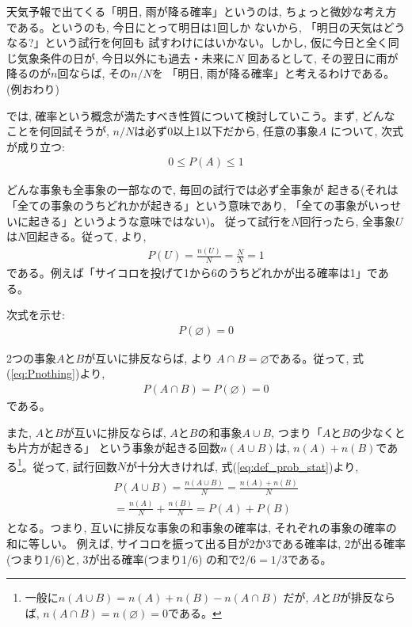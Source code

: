 \begin{exmpl} 天気予報で出てくる「明日, 雨が降る確率」というのは, 
ちょっと微妙な考え方である。というのも, 今日にとって明日は1回しか
ないから, 「明日の天気はどうなる?」という試行を何回も
試すわけにはいかない。しかし, 仮に今日と全く同じ気象条件の日が, 
今日以外にも過去・未来に$N$
回あるとして, その翌日に雨が降るのが$n$回ならば, その$n/N$を
「明日, 雨が降る確率」と考えるわけである。(例おわり)\end{exmpl}

\begin{freqmiss}{\small{}}\end{freqmiss}
\mv

では, 確率という概念が満たすべき性質について検討していこう。まず, 
どんなことを何回試そうが, $n/N$は必ず0以上1以下だから, 任意の事象$A$
について, 次式が成り立つ:
\begin{eqnarray}0\leq P(A) \leq 1\end{eqnarray}

どんな事象も全事象の一部なので, 毎回の試行では必ず全事象が
起きる(それは「全ての事象のうちどれかが起きる」という意味であり, 
「全ての事象がいっせいに起きる」というような意味ではない)。
従って試行を$N$回行ったら, 全事象$U$は$N$回起きる。従って, 
より, 
\begin{eqnarray}P(U)=\frac{n(U)}{N}=\frac{N}{N}=1\label{eq:univevent}\end{eqnarray}
である。例えば「サイコロを投げて1から6のうちどれかが出る確率は1」である。
\mv

\begin{q}\label{q:stat_Pnothing} 次式を示せ:
\begin{eqnarray}P(\varnothing)=0\label{eq:Pnothing}\end{eqnarray}\end{q}
\mv

2つの事象$A$と$B$が互いに排反ならば, より
$A\cap B=\varnothing$である。従って, 式(\ref{eq:Pnothing})より, 
\begin{eqnarray}P(A \cap B)=P(\varnothing)=0\label{eq:exclusive}\end{eqnarray}
である。

また, $A$と$B$が互いに排反ならば, $A$と$B$の和事象$A\cup B$, つまり「$A$と$B$の少なくとも片方が起きる」
という事象が起きる回数$n(A\cup B)$は, $n(A)+n(B)$である\footnote{一般に$n(A\cup B)=n(A)+n(B)-n(A\cap B)$
だが, $A$と$B$が排反ならば, $n(A\cap B)=n(\varnothing)=0$である。}。従って, 試行回数$N$が十分大きければ, 
式(\ref{eq:def_prob_stat})より, 
\begin{eqnarray}\begin{split}P(A\cup B)=\frac{n(A\cup B)}{N}=\frac{n(A)+n(B)}{N}\\
=\frac{n(A)}{N}+\frac{n(B)}{N}=P(A)+P(B)
\end{split}\label{eq:totalprobexclusion}\end{eqnarray}
となる。つまり, 互いに排反な事象の和事象の確率は, それぞれの事象の確率の和に等しい。
例えば, サイコロを振って出る目が2か3である確率は, 2が出る確率(つまり1/6)と, 3が出る確率(つまり1/6)
の和で$2/6=1/3$である。

